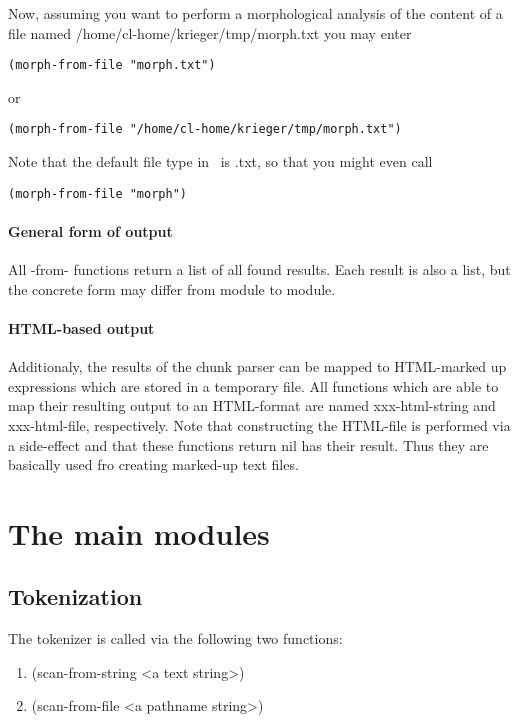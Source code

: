 Now, assuming you want to perform a morphological analysis of the
content of a file named /home/cl-home/krieger/tmp/morph.txt you may
enter

\begin{verbatim}
(morph-from-file "morph.txt")
\end{verbatim}
\noindent or 
\begin{verbatim}
(morph-from-file "/home/cl-home/krieger/tmp/morph.txt")
\end{verbatim}

\noindent Note that the default file type in \smes\ is 
{\sc .txt}, so that you might even call
\begin{verbatim}
(morph-from-file "morph")
\end{verbatim}

\paragraph{General form of output}
All {\sc -from-} functions return a list of all found results. Each result is also a
list, but the concrete form may differ from module to module.

\paragraph{HTML-based output} Additionaly, the results of the chunk
parser can be mapped to HTML-marked up expressions which are stored in
a temporary file. All functions which are able to map their resulting
output to an HTML-format are named {\sc xxx-html-string} and 
{\sc xxx-html-file}, respectively. Note that constructing the HTML-file
is performed via a side-effect and that these functions return {\sc nil} has
their result. Thus they are basically used fro creating marked-up text files.

\section{The main modules}

\subsection{Tokenization} The tokenizer is called via the following two
functions:

\begin{enumerate}

\item   {\sc (scan-from-string <a text string>)}
\item   {\sc (scan-from-file <a pathname string>)}

\end{enumerate}

